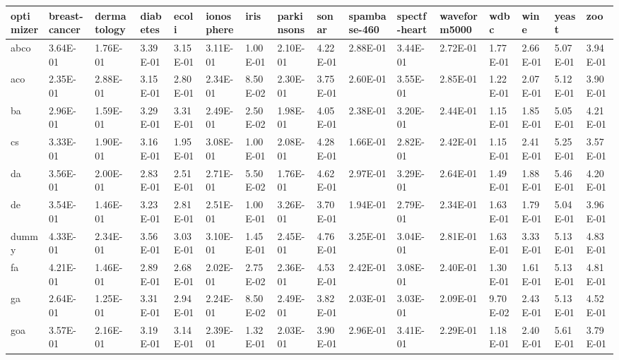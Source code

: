 \begin{table}
    \begin{adjustbox}{width=\linewidth}
        \begin{tabular}{llllllllllllllll}
            \toprule
            optimizer & breast-cancer & dermatology & diabetes & ecoli    & ionosphere & iris     & parkinsons & sonar    & spambase-460 & spectf-heart & waveform5000 & wdbc     & wine     & yeast    & zoo\tabularnewline
            \midrule
            abco      & 3.64E-01      & 1.76E-01    & 3.39E-01 & 3.15E-01 & 3.11E-01   & 1.00E-01 & 2.10E-01   & 4.22E-01 & 2.88E-01     & 3.44E-01     & 2.72E-01     & 1.77E-01 & 2.66E-01 & 5.07E-01 & 3.94E-01\tabularnewline
            aco       & 2.35E-01      & 2.88E-01    & 3.15E-01 & 2.80E-01 & 2.34E-01   & 8.50E-02 & 2.30E-01   & 3.75E-01 & 2.60E-01     & 3.55E-01     & 2.85E-01     & 1.22E-01 & 2.07E-01 & 5.12E-01 & 3.90E-01\tabularnewline
            ba        & 2.96E-01      & 1.59E-01    & 3.29E-01 & 3.31E-01 & 2.49E-01   & 2.50E-02 & 1.98E-01   & 4.05E-01 & 2.38E-01     & 3.20E-01     & 2.44E-01     & 1.15E-01 & 1.85E-01 & 5.05E-01 & 4.21E-01\tabularnewline
            cs        & 3.33E-01      & 1.90E-01    & 3.16E-01 & 1.95E-01 & 3.08E-01   & 1.00E-01 & 2.08E-01   & 4.28E-01 & 1.66E-01     & 2.82E-01     & 2.42E-01     & 1.15E-01 & 2.41E-01 & 5.25E-01 & 3.57E-01\tabularnewline
            da        & 3.56E-01      & 2.00E-01    & 2.83E-01 & 2.51E-01 & 2.71E-01   & 5.50E-02 & 1.76E-01   & 4.62E-01 & 2.97E-01     & 3.29E-01     & 2.64E-01     & 1.49E-01 & 1.88E-01 & 5.46E-01 & 4.20E-01\tabularnewline
            de        & 3.54E-01      & 1.46E-01    & 3.23E-01 & 2.81E-01 & 2.51E-01   & 1.00E-01 & 3.26E-01   & 3.70E-01 & 1.94E-01     & 2.79E-01     & 2.34E-01     & 1.63E-01 & 1.79E-01 & 5.04E-01 & 3.96E-01\tabularnewline
            dummy     & 4.33E-01      & 2.34E-01    & 3.56E-01 & 3.03E-01 & 3.10E-01   & 1.45E-01 & 2.45E-01   & 4.76E-01 & 3.25E-01     & 3.04E-01     & 2.81E-01     & 1.63E-01 & 3.33E-01 & 5.13E-01 & 4.83E-01\tabularnewline
            fa        & 4.21E-01      & 1.46E-01    & 2.89E-01 & 2.68E-01 & 2.02E-01   & 2.75E-02 & 2.36E-01   & 4.53E-01 & 2.42E-01     & 3.08E-01     & 2.40E-01     & 1.30E-01 & 1.61E-01 & 5.13E-01 & 4.81E-01\tabularnewline
            ga        & 2.64E-01      & 1.25E-01    & 3.31E-01 & 2.94E-01 & 2.24E-01   & 8.50E-02 & 2.49E-01   & 3.82E-01 & 2.03E-01     & 3.03E-01     & 2.09E-01     & 9.70E-02 & 2.43E-01 & 5.13E-01 & 4.52E-01\tabularnewline
            goa       & 3.57E-01      & 2.16E-01    & 3.19E-01 & 3.14E-01 & 2.39E-01   & 1.32E-01 & 2.03E-01   & 3.90E-01 & 2.96E-01     & 3.41E-01     & 2.29E-01     & 1.18E-01 & 2.40E-01 & 5.61E-01 & 3.79E-01\tabularnewline

\end{tabular}
\end{adjustbox}
\end{table}
